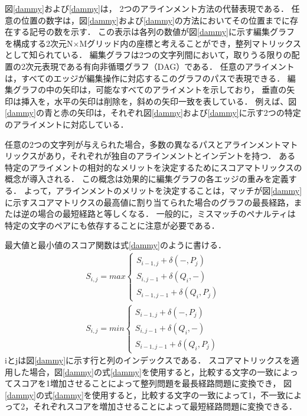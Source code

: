 図\ref{dammy}および\ref{dammy}は， 2つのアラインメント方法の代替表現である．
任意の位置の数字は，図\ref{dammy}および\ref{dammy}の方法においてその位置までに存在する記号の数を示す．
この表示は各列の数値が図\ref{dammy}に示す編集グラフを構成する2次元N×Mグリッド内の座標と考えることができ，整列マトリックスとして知られている．
編集グラフは2つの文字列間において，取りうる限りの配置の2次元表現である有向非循環グラフ（DAG）である．
任意のアライメントは，すべてのエッジが編集操作に対応するこのグラフのパスで表現できる．
編集グラフの中の矢印は，可能なすべてのアライメントを示しており，
垂直の矢印は挿入を，水平の矢印は削除を，斜めの矢印一致を表している．
例えば、図\ref{dammy}の青と赤の矢印は，それぞれ図\ref{dammy}および\ref{dammy}に示す2つの特定のアライメントに対応している．

任意の2つの文字列が与えられた場合，多数の異なるパスとアラインメントマトリックスがあり，それぞれが独自のアラインメントとインデントを持つ．
ある特定のアライメントの相対的なメリットを決定するためにスコアマトリックスの概念が導入される．
この概念は効果的に編集グラフの各エッジの重みを定義する．
よって，アラインメントのメリットを決定することは，マッチが図\ref{dammy}に示すスコアマトリクスの最高値に割り当てられた場合のグラフの最長経路，または逆の場合の最短経路と等しくなる．
一般的に，ミスマッチのペナルティは特定の文字のペアにも依存することに注意が必要である．

最大値と最小値のスコア関数は式\ref{dammy}のように書ける．
\begin{subequations}
\begin{align}
S_{i,j}= max \left \{
\begin{array}{l}
S_{i-1,j}+\delta(-,P_{j}) \\
S_{i,j-1}+\delta(Q_{i},-) \\
S_{i-1,j-1}+\delta(Q_{i},P_{j})
\end{array}
\right.\label{eq:maxscore} \\
S_{i,j}= min \left \{
\begin{array}{l}
S_{i-1,j}+\delta(-,P_{j}) \\
S_{i,j-1}+\delta(Q_{i},-) \\
S_{i-1,j-1}+\delta(Q_{i},P_{j})
\end{array}
\right.\label{eq:minscore}
\end{align}
\label{eq:minmaxscore}
\end{subequations}
iとjは図\ref{dammy}に示す行と列のインデックスである．
スコアマトリックスを適用した場合，図\ref{dammy}の式\ref{dammy}を使用すると，比較する文字の一致によってスコアを1増加させることによって整列問題を最長経路問題に変換でき，
図\ref{dammy}の式\ref{dammy}を使用すると，比較する文字の一致によって1，不一致によって2，それぞれスコアを増加させることによって最短経路問題に変換できる．

